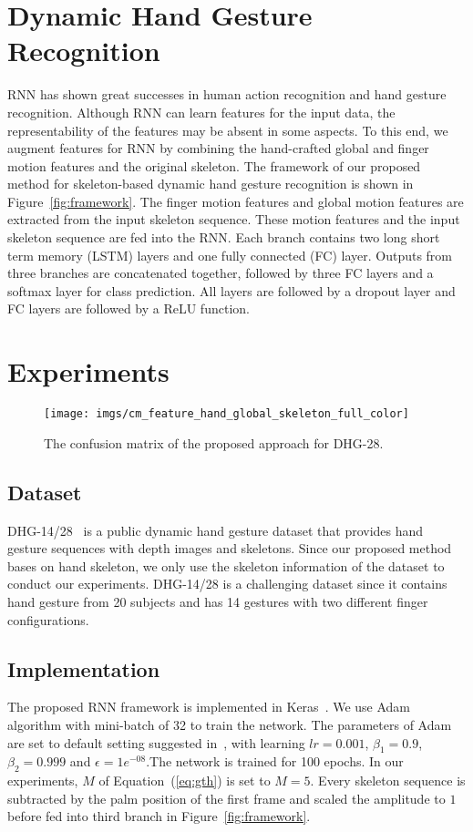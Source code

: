 \documentclass{article}
\begin{document}
\section{Dynamic Hand Gesture Recognition}
\label{sec:dhgr}

RNN has shown great successes in human action recognition and hand gesture recognition. Although RNN can learn features for the input data, the representability of the features may be absent in some aspects. To this end, we augment features for RNN by combining the hand-crafted global and finger motion features and the original skeleton. The framework of our proposed method for skeleton-based dynamic hand gesture recognition is shown in Figure~\ref{fig:framework}. The finger motion features and global motion features are extracted from the input skeleton sequence. These motion features and the input skeleton sequence are fed into the RNN. Each branch contains two long short term memory (LSTM) layers and one fully connected (FC) layer. Outputs from three branches are concatenated together, followed by three FC layers and a softmax layer for class prediction. All layers are followed by a dropout layer and FC layers are followed by a ReLU function.


\section{Experiments}
\label{sec:exp}
\begin{figure*}[htb]
  \centering
  \centerline{\texttt{[image: imgs/cm\_feature\_hand\_global\_skeleton\_full\_color]}}
\caption{The confusion matrix of the proposed approach for DHG-28.}
\label{fig:res28}
\end{figure*}
\subsection{Dataset}
\label{ssec:dataset}

DHG-14/28~\cite{de2016skeleton} is a public dynamic hand gesture dataset that provides hand gesture sequences with depth images and skeletons. Since our proposed method bases on hand skeleton, we only use the skeleton information of the dataset to conduct our experiments. DHG-14/28 is a challenging dataset since it contains hand gesture from 20 subjects and has 14 gestures with two different finger configurations.

\subsection{Implementation}
The proposed RNN framework is implemented in Keras~\cite{chollet2015keras}. We use Adam~\cite{kingma2014adam} algorithm with mini-batch of 32 to train the network. The parameters of Adam are set to default setting suggested in~\cite{kingma2014adam}, with learning $lr=0.001$, $\beta_1=0.9$, $\beta_2=0.999$ and $\epsilon=1e^{-08}$.The network is trained for 100 epochs. In our experiments, $M$ of Equation~(\ref{eq:gth}) is set to $M=5$. Every skeleton sequence is subtracted by the palm position of the first frame and scaled the amplitude to $1$ before fed into third branch in Figure~\ref{fig:framework}.
\end{document}
